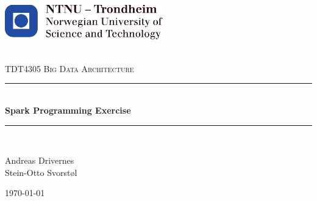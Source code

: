 \begin{titlepage}
\centering

\begin{center}
    \includegraphics[height=1.5cm]{figs/ntnu_logo.pdf}\\[1cm] %
\end{center}


\begin{center}

\newcommand{\myauthor}{Andreas Drivernes \\ Stein-Otto Svorstøl} 
\newcommand{\mytitle}{Spark Programming Exercise }

~\\[1.5cm]

\textsc{\Large TDT4305 Big Data Architecture }\\[0.5cm]

\hrule ~\\[0.2cm]
{\huge \bfseries \mytitle}\\[0.5cm]		%
\hrule ~\\[1.5cm]



\begin{minipage}{0.4\textwidth}
    \centering
	\large
		\myauthor\\
		\vspace{2.5cm}
		\vspace{1.5cm}
\end{minipage}

\vfill

{\large \today}

\end{center}
\end{titlepage}


\thispagestyle{empty}
